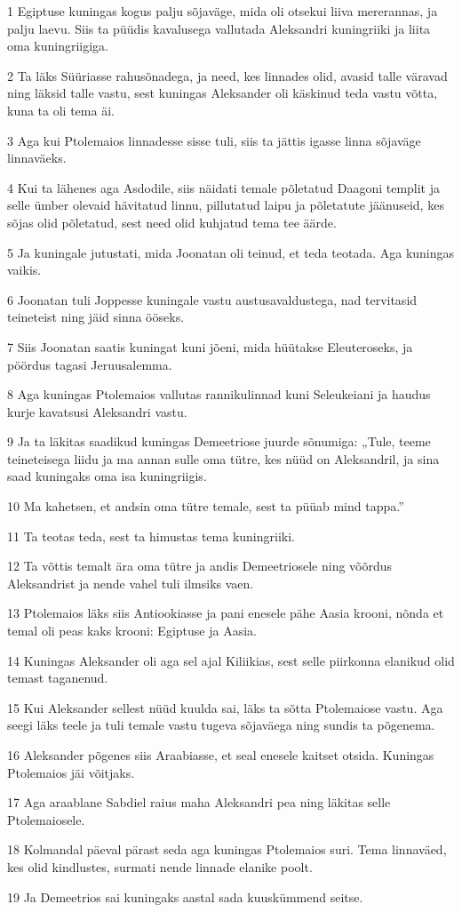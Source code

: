 \par 1 Egiptuse kuningas kogus palju sõjaväge, mida oli otsekui liiva mererannas, ja palju laevu. Siis ta püüdis kavalusega vallutada Aleksandri kuningriiki ja liita oma kuningriigiga.
\par 2 Ta läks Süüriasse rahusõnadega, ja need, kes linnades olid, avasid talle väravad ning läksid talle vastu, sest kuningas Aleksander oli käskinud teda vastu võtta, kuna ta oli tema äi.
\par 3 Aga kui Ptolemaios linnadesse sisse tuli, siis ta jättis igasse linna sõjaväge linnaväeks.
\par 4 Kui ta lähenes aga Asdodile, siis näidati temale põletatud Daagoni templit ja selle ümber olevaid hävitatud linnu, pillutatud laipu ja põletatute jäänuseid, kes sõjas olid põletatud, sest need olid kuhjatud tema tee äärde.
\par 5 Ja kuningale jutustati, mida Joonatan oli teinud, et teda teotada. Aga kuningas vaikis.
\par 6 Joonatan tuli Joppesse kuningale vastu austusavaldustega, nad tervitasid teineteist ning jäid sinna ööseks.
\par 7 Siis Joonatan saatis kuningat kuni jõeni, mida hüütakse Eleuteroseks, ja pöördus tagasi Jeruusalemma.
\par 8 Aga kuningas Ptolemaios vallutas rannikulinnad kuni Seleukeiani ja haudus kurje kavatsusi Aleksandri vastu.
\par 9 Ja ta läkitas saadikud kuningas Demeetriose juurde sõnumiga: „Tule, teeme teineteisega liidu ja ma annan sulle oma tütre, kes nüüd on Aleksandril, ja sina saad kuningaks oma isa kuningriigis.
\par 10 Ma kahetsen, et andsin oma tütre temale, sest ta püüab mind tappa.”
\par 11 Ta teotas teda, sest ta himustas tema kuningriiki.
\par 12 Ta võttis temalt ära oma tütre ja andis Demeetriosele ning võõrdus Aleksandrist ja nende vahel tuli ilmsiks vaen.
\par 13 Ptolemaios läks siis Antiookiasse ja pani enesele pähe Aasia krooni, nõnda et temal oli peas kaks krooni: Egiptuse ja Aasia.
\par 14 Kuningas Aleksander oli aga sel ajal Kiliikias, sest selle piirkonna elanikud olid temast taganenud.
\par 15 Kui Aleksander sellest nüüd kuulda sai, läks ta sõtta Ptolemaiose vastu. Aga seegi läks teele ja tuli temale vastu tugeva sõjaväega ning sundis ta põgenema.
\par 16 Aleksander põgenes siis Araabiasse, et seal enesele kaitset otsida. Kuningas Ptolemaios jäi võitjaks.
\par 17 Aga araablane Sabdiel raius maha Aleksandri pea ning läkitas selle Ptolemaiosele.
\par 18 Kolmandal päeval pärast seda aga kuningas Ptolemaios suri. Tema linnaväed, kes olid kindlustes, surmati nende linnade elanike poolt.
\par 19 Ja Demeetrios sai kuningaks aastal sada kuuskümmend seitse. 

